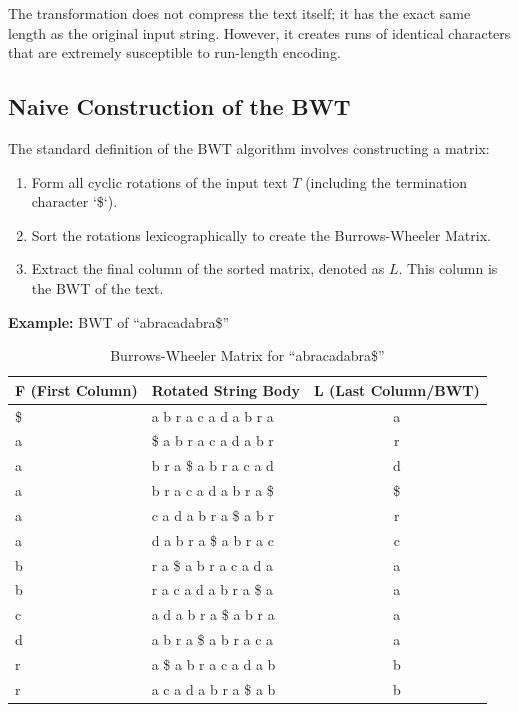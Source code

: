 The transformation does not compress the text itself; it has the exact same length as the original input string. However, it creates runs of identical characters that are extremely susceptible to run-length encoding. 

\subsection{Naive Construction of the BWT}
The standard definition of the BWT algorithm involves constructing a matrix:
\begin{enumerate}
    \item Form all cyclic rotations of the input text \( T \) (including the termination character `\$`).
    \item Sort the rotations lexicographically to create the Burrows-Wheeler Matrix.
    \item Extract the final column of the sorted matrix, denoted as \( L \). This column is the BWT of the text.
\end{enumerate}

\textbf{Example:} BWT of ``abracadabra\$''
\begin{table}[h]
\centering
\caption{Burrows-Wheeler Matrix for ``abracadabra\$''}
\begin{tabularx}{\textwidth}{l X c}
\toprule
\textbf{F (First Column)} & \textbf{Rotated String Body} & \textbf{L (Last Column/BWT)} \\
\midrule
\$ & a b r a c a d a b r a & a \\
a & \$ a b r a c a d a b r & r \\
a & b r a \$ a b r a c a d & d \\
a & b r a c a d a b r a \$ & \$ \\
a & c a d a b r a \$ a b r & r \\
a & d a b r a \$ a b r a c & c \\
b & r a \$ a b r a c a d a & a \\
b & r a c a d a b r a \$ a & a \\
c & a d a b r a \$ a b r a & a \\
d & a b r a \$ a b r a c a & a \\
r & a \$ a b r a c a d a b & b \\
r & a c a d a b r a \$ a b & b \\
\bottomrule
\end{tabularx}
\end{table}

